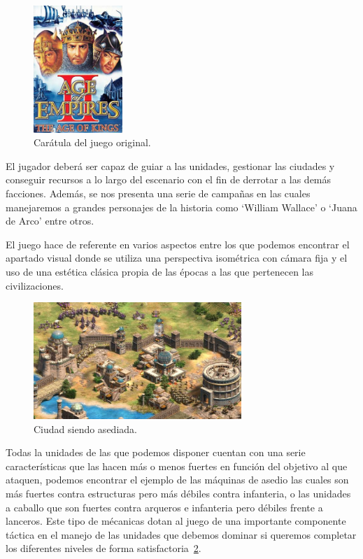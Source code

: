 \begin{figure}[ht]
\centering
\includegraphics[width=0.3\textwidth]{imagenes/marco_teo/referentes/aoe_1.png}
\caption{Carátula del juego original.}
\label{img:aoe_1}
\end{figure}

El jugador deberá ser capaz de guiar a las unidades, gestionar las ciudades y conseguir
recursos a lo largo del escenario con el fin de derrotar a las demás facciones. Además,
se nos presenta una serie de campañas en las cuales manejaremos a grandes personajes de
la historia como `William Wallace' o `Juana de Arco' entre otros.

El juego hace de referente en varios aspectos entre los que podemos encontrar el
apartado visual donde se utiliza una perspectiva isométrica con cámara fija y el uso
de una estética clásica propia de las épocas a las que pertenecen las civilizaciones.

\begin{figure}[ht]
\centering
\includegraphics[width=0.7\textwidth]{imagenes/marco_teo/referentes/aoe_2.png}
\caption{Ciudad siendo asediada.}
\label{img:aoe_2}
\end{figure}

Todas la unidades de las que podemos disponer cuentan con una serie características que
las hacen más o menos fuertes en función del objetivo al que ataquen, podemos encontrar
el ejemplo de las máquinas de asedio las cuales son más fuertes contra estructuras pero
más débiles contra infanteria, o las unidades a caballo que son fuertes contra arqueros
e infanteria pero débiles frente a lanceros.
Este tipo de mécanicas dotan al juego de una importante componente táctica en el manejo
de las unidades que debemos dominar si queremos completar los diferentes niveles de
forma satisfactoria~\ref{img:aoe_2}.

